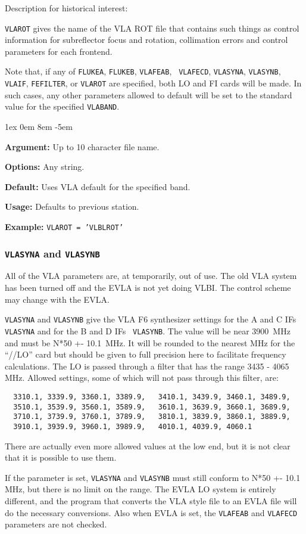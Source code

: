 \documentclass{report}
\newcommand{\rcwbox}[5]{
  \begin{list}{}{\parsep 1ex  \itemsep 0em
                 \leftmargin 8em  \itemindent -5em }
    \item {\bf Argument:} #1
    \item {\bf Options:}  #2
    \item {\bf Default:}  #3
    \item {\bf Usage:}    #4
    \item {\bf Example:}  #5
  \end{list}
}
\begin{document}
Description for historical interest:

{\tt VLAROT} gives the name of the VLA ROT file that contains such
things as control information for subreflector focus and rotation,
collimation errors and control parameters for each frontend.

Note that, if any of {\tt FLUKEA}, {\tt FLUKEB}, {\tt VLAFEAB}, {\tt
VLAFECD}, {\tt VLASYNA}, {\tt VLASYNB}, {\tt VLAIF}, {\tt FEFILTER},
or {\tt VLAROT} are specified, both LO and FI cards will be made.  In
such cases, any other parameters allowed to default will be set to the
standard value for the specified {\tt VLABAND}.

\rcwbox
{Up to 10 character file name.}
{Any string.}
{Uses VLA default for the specified band.}
{Defaults to previous station.}
{{\tt VLAROT = 'VLBLROT'}}


\subsubsection{\label{SP:VLASYNA}{\tt VLASYNA} and {\tt VLASYNB}}

All of the VLA parameters are, at temporarily, out of use.  The old
VLA system has been turned off and the EVLA is not yet doing VLBI.
The control scheme may change with the EVLA.

{\tt VLASYNA} and {\tt VLASYNB} give the VLA F6 synthesizer settings
for the A and C IFs {\tt VLASYNA} and for the B and D IFs {\tt
VLASYNB}.  The value will be near 3900~MHz and must be N*50 +-
10.1~MHz.  It will be rounded to the nearest MHz for the ``//LO''
card but should be given to full precision here to facilitate
frequency calculations.  The LO is passed through a filter
that has the range 3435 - 4065 MHz.  Allowed settings, some of
which will not pass through this filter, are:

\begin{verbatim}
  3310.1, 3339.9, 3360.1, 3389.9,   3410.1, 3439.9, 3460.1, 3489.9,
  3510.1, 3539.9, 3560.1, 3589.9,   3610.1, 3639.9, 3660.1, 3689.9,
  3710.1, 3739.9, 3760.1, 3789.9,   3810.1, 3839.9, 3860.1, 3889.9,
  3910.1, 3939.9, 3960.1, 3989.9,   4010.1, 4039.9, 4060.1
\end{verbatim}

There are actually even more allowed values at the low end, but
it is not clear that it is possible to use them.

If the parameter  is set, {\tt VLASYNA} and
{\tt VLASYNB} must still conform to N*50 +- 10.1 MHz, but there is no
limit on the range.  The EVLA LO system is entirely different, and the
program that converts the VLA style file to an EVLA file will do the
necessary conversions.  Also when EVLA is set, the
{\tt VLAFEAB} and {\tt VLAFECD} parameters are not checked.
\end{document}

